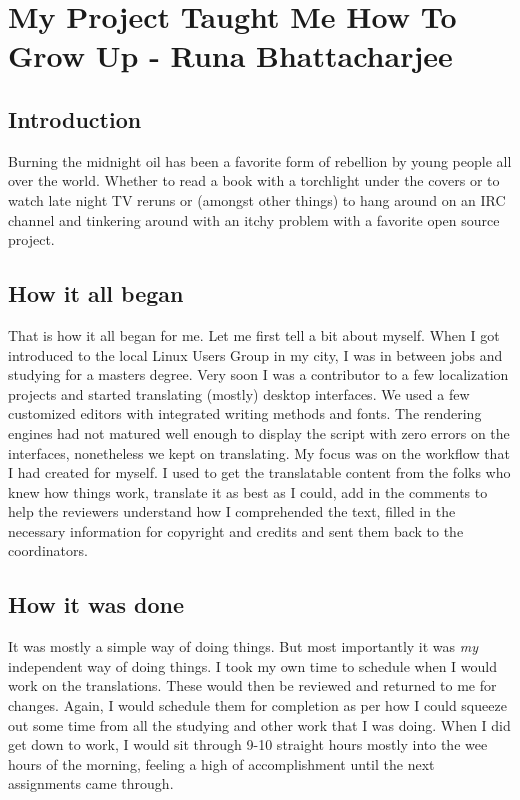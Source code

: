\chapter{My Project Taught Me How To Grow Up - Runa Bhattacharjee}
\section*{Introduction}

Burning the midnight oil has been a favorite form of rebellion by young people
all over the world. Whether to read a book with a torchlight under the covers or
to watch late night TV reruns or (amongst other things) to hang around on an IRC
channel and tinkering around with an itchy problem with a favorite open source
project. 

\section*{How it all began}

That is how it all began for me. Let me first tell a bit about myself. When I
got introduced to the local Linux Users Group in my city, I was in between jobs
and studying for a masters degree. Very soon I was a contributor to a few
localization projects and started translating (mostly) desktop interfaces. We
used a few customized editors with integrated writing methods and fonts. The
rendering engines had not matured well enough to display the script with zero
errors on the interfaces, nonetheless we kept on translating. My focus was on
the workflow that I had created for myself. I used to get the translatable
content from the folks who knew how things work, translate it as best as I
could, add in the comments to help the reviewers understand how I comprehended
the text, filled in the necessary information for copyright and credits and sent
them back to the coordinators.

\section*{How it was done}

It was mostly a simple way of doing things. But most importantly it was
\textit{my} independent way of doing things. I took my own time to schedule when
I would work on the translations. These would then be reviewed and returned to
me for changes. Again, I would schedule them for completion as per how I could
squeeze out some time from all the studying and other work that I was doing.
When I did get down to work, I would sit through 9-10 straight hours mostly into
the wee hours of the morning, feeling a high of accomplishment until the next
assignments came through.

